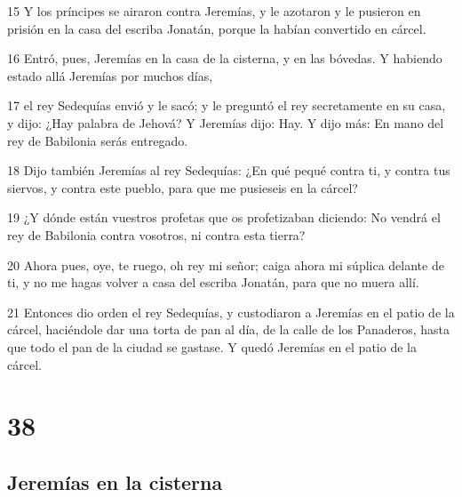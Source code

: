 \par 15 Y los príncipes se airaron contra Jeremías, y le azotaron y le pusieron en prisión en la casa del escriba Jonatán, porque la habían convertido en cárcel.
\par 16 Entró, pues, Jeremías en la casa de la cisterna, y en las bóvedas. Y habiendo estado allá Jeremías por muchos días,
\par 17 el rey Sedequías envió y le sacó; y le preguntó el rey secretamente en su casa, y dijo: ¿Hay palabra de Jehová? Y Jeremías dijo: Hay. Y dijo más: En mano del rey de Babilonia serás entregado.
\par 18 Dijo también Jeremías al rey Sedequías: ¿En qué pequé contra ti, y contra tus siervos, y contra este pueblo, para que me pusieseis en la cárcel?
\par 19 ¿Y dónde están vuestros profetas que os profetizaban diciendo: No vendrá el rey de Babilonia contra vosotros, ni contra esta tierra?
\par 20 Ahora pues, oye, te ruego, oh rey mi señor; caiga ahora mi súplica delante de ti, y no me hagas volver a casa del escriba Jonatán, para que no muera allí.
\par 21 Entonces dio orden el rey Sedequías, y custodiaron a Jeremías en el patio de la cárcel, haciéndole dar una torta de pan al día, de la calle de los Panaderos, hasta que todo el pan de la ciudad se gastase. Y quedó Jeremías en el patio de la cárcel.

\chapter{38}

\section*{Jeremías en la cisterna}

